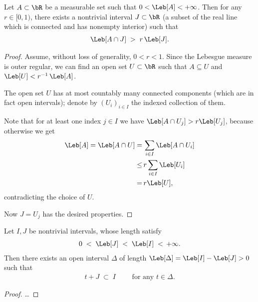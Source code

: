 \begin{lemma}
  \label{lem:exists-high-overlap-interval}
  \leanok
  Let $A \subset \bR$ be a measurable set such that $0 < \Leb[A] < +\infty$.
  Then for any $r \in [0,1)$, there exists a nontrivial interval $J \subset \bR$
  (a subset of the real line which is connected and has nonempty interior)
  such that
  \begin{align*}
    \Leb[A \cap J] \; > \; r \, \Leb[J] .
  \end{align*}
\end{lemma}
\begin{proof}
  Assume, without loss of generality, $0 < r < 1$.
  Since the Lebesgue measure is outer regular, we can find an open set $U \subset \bR$
  such that $A \subseteq U$ and $\Leb[U] < r^{-1} \, \Leb[A]$.

  The open set $U$ has at most countably many connected components
  (which are in fact open intervals); denote
  by $(U_i)_{i \in I}$ the indexed collection of them.

  Note that for at least one index $j \in I$ we
  have $\Leb[A \cap U_j] > r \Leb[U_j]$,
  because otherwise we get
  \begin{align*}
    \Leb[A] = \Leb[A \cap U]
    = \, & \sum_{i \in I} \Leb[A \cap U_i] \\
    \le \, & r \sum_{i \in I} \Leb[U_i] \\
    = \, & r \Leb[U],
  \end{align*}
  contradicting the choice of $U$.

  Now $J = U_j$ has the desired properties.
\end{proof}

\begin{lemma}
  \label{lem:shift-interval-contained-in-larger}
  Let $I, J$ be nontrivial intervals, whose length satisfy
  \begin{align*}
    0 \; < \; \Leb[J] \; < \; \Leb[I] \; < \, +\infty .
  \end{align*}
  Then there exists an open interval $\Delta$ of length
  $\Leb[\Delta] = \Leb[I] - \Leb[J] > 0$ such that
  \begin{align*}
    t + J \; \subset \; I
    \qquad \text{ for any $t \in \Delta$.}
  \end{align*}
\end{lemma}
\begin{proof}
  \ldots
\end{proof}

